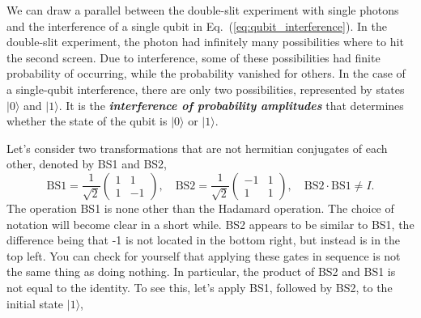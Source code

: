 We can draw a parallel between the double-slit experiment with single photons and the interference of a single qubit in Eq.~(\ref{eq:qubit_interference}).
In the double-slit experiment, the photon had infinitely many possibilities where to hit the second screen.
Due to interference, some of these possibilities had finite probability of occurring, while the probability vanished for others.
In the case of a single-qubit interference, there are only two possibilities, represented by states $|0\rangle$ and $|1\rangle$.
It is the \textbf{\emph{interference of probability amplitudes}} that determines whether the state of the qubit is $|0\rangle$ or $|1\rangle$.

Let's consider two transformations that are not hermitian conjugates of each other, denoted by BS1 and BS2,
\begin{equation}
    \text{BS}1 = \frac{1}{\sqrt{2}} \begin{pmatrix} 1 & 1 \\ 1 & -1 \end{pmatrix}, \quad
    \text{BS}2 = \frac{1}{\sqrt{2}}\begin{pmatrix} -1 & 1 \\ 1 & 1 \end{pmatrix}, \quad
    \text{BS}2 \cdot \text{BS1} \neq I.
    \label{eq:BS_transformations}
\end{equation}
The operation BS1 is none other than the Hadamard operation.
The choice of notation will become clear in a short while. 
BS2 appears to be similar to BS1, the difference being that -1 is not located in the bottom right, but instead is in the top left.
You can check for yourself that applying these gates in sequence is not the same thing as doing nothing.
In particular, the product of BS2 and BS1 is not equal to the identity.
To see this, let's apply BS1, followed by BS2, to the initial state $|1\rangle$,
